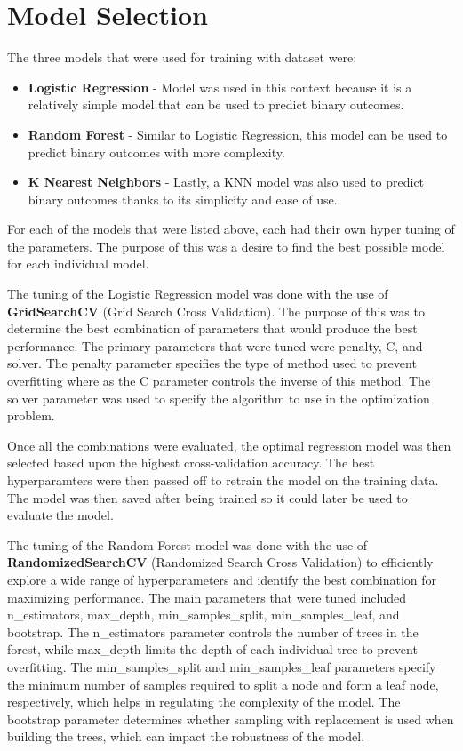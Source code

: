 \section{Model Selection}

The three models that were used for training with dataset were:

\begin{itemize}
    \item \textbf{Logistic Regression} - Model was used in this context because it is a relatively simple model that can be used to predict binary outcomes.
    \item \textbf{Random Forest} - Similar to Logistic Regression, this model can be used to predict binary outcomes with more complexity.
    \item \textbf{K Nearest Neighbors} - Lastly, a KNN model was also used to predict binary outcomes thanks to its simplicity and ease of use.
\end{itemize}

For each of the models that were listed above, each had their own hyper tuning of the parameters. The purpose of this was a desire to find the best possible model for each individual model.


The tuning of the Logistic Regression model was done with the use of \textbf{GridSearchCV} (Grid Search Cross Validation). The purpose of this was to determine the best combination of parameters that would produce
the best performance. The primary parameters that were tuned were penalty, C, and solver. The penalty parameter specifies the type of method used to prevent overfitting where as the C parameter controls the inverse of this method. The
solver parameter was used to specify the algorithm to use in the optimization problem.

Once all the combinations were evaluated, the optimal regression model was then selected based upon the highest cross-validation accuracy. The best hyperparamters were then passed off to retrain the model on the training data. The model
was then saved after being trained so it could later be used to evaluate the model.


The tuning of the Random Forest model was done with the use of \textbf{RandomizedSearchCV} (Randomized Search Cross Validation) to efficiently explore a wide range of hyperparameters and identify the best 
combination for maximizing performance. The main parameters that were tuned included n\_estimators, max\_depth, min\_samples\_split, min\_samples\_leaf, and bootstrap. The n\_estimators parameter controls 
the number of trees in the forest, while max\_depth limits the depth of each individual tree to prevent overfitting. The min\_samples\_split and min\_samples\_leaf parameters specify the minimum number of 
samples required to split a node and form a leaf node, respectively, which helps in regulating the complexity of the model. The bootstrap parameter determines whether sampling with replacement is used when 
building the trees, which can impact the robustness of the model.

